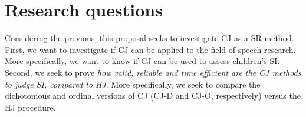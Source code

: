 \section{Research questions} \label{seq:rq}

Considering the previous, this proposal seeks to investigate CJ as a SR method. First, we want to investigate if CJ can be applied to the field of speech research. More specifically, we want to know if CJ can be used to assess children’s SI. Second, we seek to prove \textit{how valid, reliable and time efficient are the CJ methods to judge SI, compared to HJ}. More specifically, we seek to compare the dichotomous and ordinal versions of CJ (CJ-D and CJ-O, respectively) versus the HJ procedure.